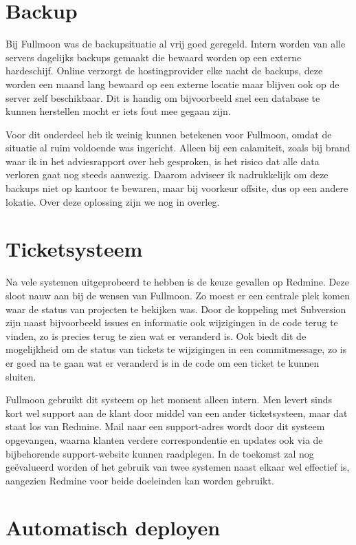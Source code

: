 \section{Backup}

Bij Fullmoon was de backupsituatie al vrij goed geregeld. Intern worden van alle servers dagelijks backups gemaakt die bewaard worden op een externe hardeschijf. Online verzorgt de hostingprovider elke nacht de backups, deze worden een maand lang bewaard op een externe locatie maar blijven ook op de server zelf beschikbaar. Dit is handig om bijvoorbeeld snel een database te kunnen herstellen mocht er iets fout mee gegaan zijn.

Voor dit onderdeel heb ik weinig kunnen betekenen voor Fullmoon, omdat de situatie al ruim voldoende was ingericht. Alleen bij een calamiteit, zoals bij brand waar ik in het adviesrapport over heb gesproken, is het risico dat alle data verloren gaat nog steeds aanwezig. Daarom adviseer ik nadrukkelijk om deze backups niet op kantoor te bewaren, maar bij voorkeur offsite, dus op een andere lokatie. Over deze oplossing zijn we nog in overleg.

\section{Ticketsysteem}

Na vele systemen uitgeprobeerd te hebben is de keuze gevallen op Redmine. Deze sloot nauw aan bij de wensen van Fullmoon. Zo moest er een centrale plek komen waar de status van projecten te bekijken was. Door de koppeling met Subversion zijn naast bijvoorbeeld issues en informatie ook wijzigingen in de code terug te vinden, zo is precies terug te zien wat er veranderd is. Ook biedt dit de mogelijkheid om de status van tickets te wijzigingen in een commitmessage, zo is er goed na te gaan wat er veranderd is in de code om een ticket te kunnen sluiten.

Fullmoon gebruikt dit systeem op het moment alleen intern. Men levert sinds kort wel support aan de klant door middel van een ander ticketsysteen, maar dat staat los van Redmine. Mail naar een support-adres wordt door dit systeem opgevangen, waarna klanten verdere correspondentie en updates ook via de bijbehorende support-website kunnen raadplegen. In de toekomst zal nog geëvalueerd worden of het gebruik van twee systemen naast elkaar wel effectief is, aangezien Redmine voor beide doeleinden kan worden gebruikt.

\section{Automatisch deployen}

